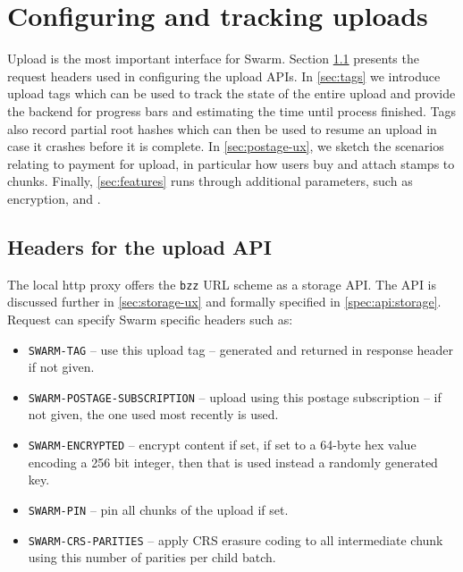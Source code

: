 \section{Configuring and tracking uploads \statusgreen}\label{sec:upload}

\green{}

Upload is the most important interface for Swarm. Section \ref{sec:headers} presents the request headers used in configuring the upload APIs. In \ref{sec:tags} we introduce upload tags which can be used to track the state of the entire upload and provide the backend for progress bars and estimating the time until process finished. Tags also record partial root hashes which can then be used to resume an upload in case it crashes before it is complete. In \ref{sec:postage-ux}, we sketch the scenarios relating to payment for upload, in particular how users buy and attach stamps to chunks. Finally, \ref{sec:features} runs through additional parameters, such as encryption,  and .

\subsection{Headers for the upload API \statusgreen}\label{sec:headers}

The local http proxy offers the \lstinline{bzz} URL scheme as a storage API. The API is discussed further in \ref{sec:storage-ux} and formally specified in \ref{spec:api:storage}. Request can specify Swarm specific headers such as:

\begin{itemize}
\item \lstinline{SWARM-TAG} -- use this upload tag -- generated and returned in response header if not given. 
\item \lstinline{SWARM-POSTAGE-SUBSCRIPTION} -- upload using this postage subscription -- if not given, the one used most recently is used. 
\item \lstinline{SWARM-ENCRYPTED} -- encrypt content if set, if set to a 64-byte hex value encoding a 256 bit integer, then that is used instead a randomly generated key. 
\item \lstinline{SWARM-PIN} -- pin all chunks of the upload if set. 
\item \lstinline{SWARM-CRS-PARITIES} -- apply CRS erasure coding to all intermediate chunk using this number of parities per child batch.
\end{itemize}



